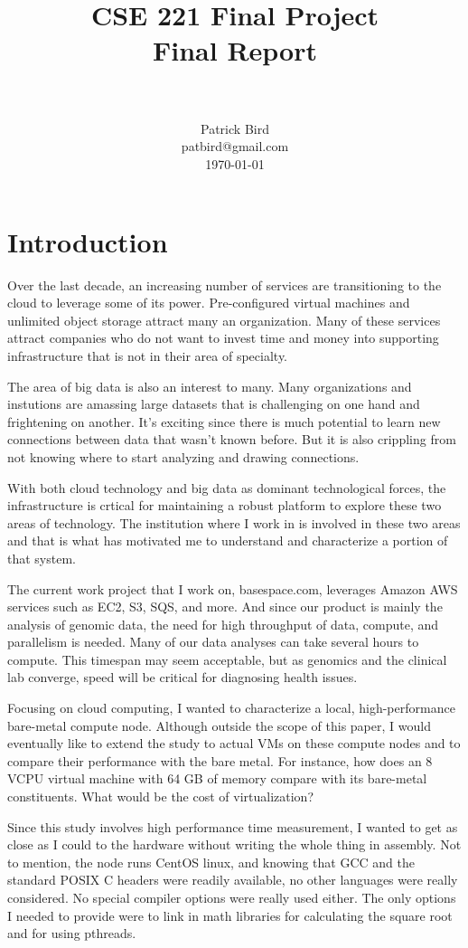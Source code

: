 \documentclass[paper=a4, fontsize=11pt]{scrartcl}
\title{
        \usefont{OT1}{bch}{b}{n}
        \normalfont \normalsize \textsc{} \\ [25pt]
        \horrule{0.5pt} \\[0.4cm]
        \huge CSE 221 Final Project \\
        \huge       Final Report         \\
        \horrule{2pt} \\[0.5cm]
}
\author{
        \normalfont                                 \normalsize
        Patrick Bird\\[-3pt]        \normalsize
        patbird@gmail.com\\           \normalsize
        \today
}
\date{}
\numberwithin{equation}{section}        %
\numberwithin{figure}{section}          %
\numberwithin{table}{section}               %
\begin{document}
\maketitle
\section{Introduction}
Over the last decade, an increasing number of services are transitioning to the cloud to leverage some of its power.  Pre-configured virtual machines and unlimited object storage attract many an organization.  Many of these services attract companies who do not want to invest time and money into supporting infrastructure that is not in their area of specialty.

The area of big data is also an interest to many.  Many organizations and instutions are amassing large datasets that is challenging on one hand and frightening on another.  It's exciting since there is much potential to learn new connections between data that wasn't known before.  But it is also crippling from not knowing where to start analyzing and drawing connections.

With both cloud technology and big data as dominant technological forces, the infrastructure is crtical for maintaining a robust platform to explore these two areas of technology.  The institution where I work in is involved in these two areas and that is what has motivated me to understand and characterize a portion of that system.

The current work project that I work on, basespace.com, leverages Amazon AWS services such as EC2, S3, SQS, and more.  And since our product is mainly the analysis of genomic data, the need for high throughput of data, compute, and parallelism is needed.  Many of our data analyses can take several hours to compute.  This timespan may seem acceptable, but as genomics and the clinical lab converge, speed will be critical for diagnosing health issues.

Focusing on cloud computing, I wanted to characterize a local, high-performance bare-metal compute node.  Although outside the scope of this paper, I would eventually like to extend the study to actual VMs on these compute nodes and to compare their performance with the bare metal.  For instance, how does an 8 VCPU virtual machine with 64 GB of memory compare with its bare-metal constituents.  What would be the cost of virtualization?

Since this study involves high performance time measurement, I wanted to get as close as I could to the hardware without writing the whole thing in assembly.  Not to mention, the node runs CentOS linux, and knowing that GCC and the standard POSIX C headers were readily available, no other languages were really considered.  No special compiler options were really used either.  The only options I needed to provide were to link in math libraries for calculating the square root and for using pthreads.
\end{document}
